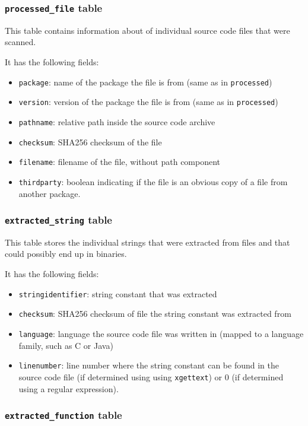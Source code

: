 \documentclass[10pt,a4paper]{article}
\begin{document}
\subsubsection{\texttt{processed\_file} table}
This table contains information about of individual source code files that were
scanned.

It has the following fields:

\begin{itemize}
\item \texttt{package}: name of the package the file is from (same as in
\texttt{processed})
\item \texttt{version}: version of the package the file is from (same as in
\texttt{processed})
\item \texttt{pathname}: relative path inside the source code archive
\item \texttt{checksum}: SHA256 checksum of the file
\item \texttt{filename}: filename of the file, without path component
\item \texttt{thirdparty}: boolean
indicating if the file is an obvious copy of a file from another package.
\end{itemize}

\subsubsection{\texttt{extracted\_string} table}
This table stores the individual strings that were extracted from files and
that could possibly end up in binaries.

It has the following fields:

\begin{itemize}
\item \texttt{stringidentifier}: string constant that was extracted
\item \texttt{checksum}: SHA256 checksum of file the string constant was
extracted from
\item \texttt{language}: language the source code file was written in (mapped
to a language family, such as C or Java)
\item \texttt{linenumber}: line number where the string constant can be found
in the source code file (if determined using using \texttt{xgettext}) or $0$
(if determined using a regular expression).
\end{itemize}

\subsubsection{\texttt{extracted\_function} table}
\end{document}
